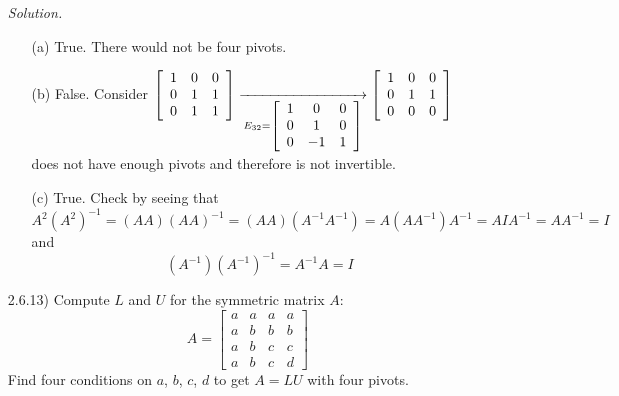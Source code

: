 \documentclass[12pt]{article}
\begin{document}
\begin{itemize}
\textit{Solution.}
	\begin{itemize}
	\item[(a)] True. There would not be four pivots.
    \item[(b)] False. Consider $\left[\begin{array}{ccc} 1 & 0 & 0 \\ 0 & 1 & 1 \\ 0 & 1 & 1 \end{array}\right]
    \underset{E_{32}=\left[\begin{array}{ccc} 1 & 0 & 0 \\ 0 & 1 & 0 \\ 0 & -1 & 1 \end{array}\right]}{\xrightarrow{\hspace{30mm}}}         	\left[\begin{array}{ccc} 1 & 0 & 0 \\ 0 & 1 & 1 \\ 0 & 0 & 0 \end{array}\right]$ \\ does not have enough pivots and therefore is not invertible.
    \item[(c)] True. Check by seeing that 
    \[A^2(A^2)^{-1} = (AA)(AA)^{-1}=(AA)(A^{-1}A^{-1})=A(AA^{-1})A^{-1}=AIA^{-1}=AA^{-1}=I\]
    and
    \[(A^{-1})(A^{-1})^{-1}=A^{-1}A=I\]
	\end{itemize}

\item[2.6.13)] Compute $L$ and $U$ for the symmetric matrix $A$:
\begin{equation*} A =
\left[\begin{array}{cccc}
a & a & a & a \\
a & b & b & b \\
a & b & c & c \\
a & b & c & d 
\end{array}\right]
\end{equation*}
Find four conditions on $a$, $b$, $c$, $d$ to get $A=LU$ with four pivots.


\end{itemize}
\end{document}
